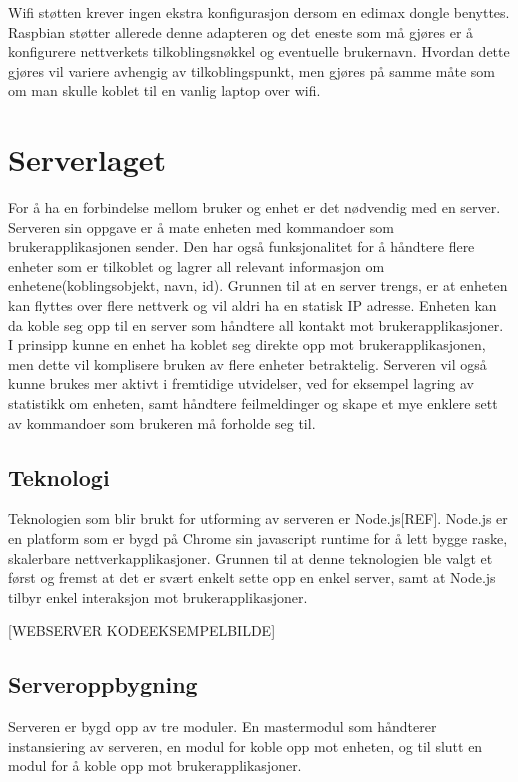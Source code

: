 \documentclass[12pt]{report}
\begin{document}
Wifi støtten krever ingen ekstra konfigurasjon dersom en edimax dongle benyttes. Raspbian støtter allerede denne adapteren og det eneste som må gjøres er å konfigurere nettverkets tilkoblingsnøkkel og eventuelle brukernavn. Hvordan dette gjøres vil variere avhengig av tilkoblingspunkt, men gjøres på samme måte som om man skulle koblet til en vanlig laptop over wifi.

\clearpage

\chapter{Serverlaget}
For å ha en forbindelse mellom bruker og enhet er det nødvendig med en server. Serveren sin oppgave er å mate enheten med kommandoer som brukerapplikasjonen sender. Den har også funksjonalitet for å håndtere flere enheter som er tilkoblet og lagrer all relevant informasjon om enhetene(koblingsobjekt, navn, id). Grunnen til at en server trengs, er at enheten kan flyttes over flere nettverk og vil aldri ha en statisk IP adresse. Enheten kan da koble seg opp til en server som håndtere all kontakt mot brukerapplikasjoner. I prinsipp kunne en enhet ha koblet seg direkte opp mot brukerapplikasjonen, men dette vil komplisere bruken av flere enheter betraktelig. Serveren vil også kunne brukes mer aktivt i fremtidige utvidelser, ved for eksempel lagring av statistikk om enheten, samt håndtere feilmeldinger og skape et mye enklere sett av kommandoer som brukeren må forholde seg til.

\section{Teknologi}
Teknologien som blir brukt for utforming av serveren er Node.js[REF]. Node.js er en platform som er bygd på Chrome sin javascript runtime for å lett bygge raske, skalerbare nettverkapplikasjoner. Grunnen til at denne teknologien ble valgt et først og fremst at det er svært enkelt sette opp en enkel server, samt at Node.js tilbyr enkel interaksjon mot brukerapplikasjoner. 

[WEBSERVER KODEEKSEMPELBILDE]

\section{Serveroppbygning}
Serveren er bygd opp av tre moduler. En mastermodul som håndterer instansiering av serveren, en modul for koble opp mot enheten, og til slutt en modul for å koble opp mot brukerapplikasjoner. 
\end{document}
